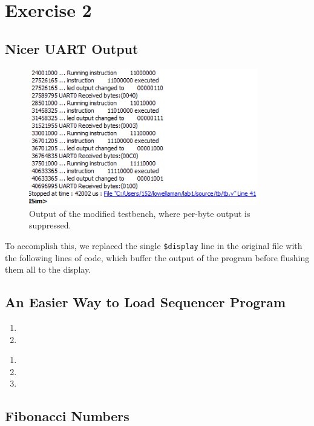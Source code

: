 \documentclass[]{article}
\begin{document}
\section{Exercise 2}


\subsection{Nicer UART Output}
\begin{figure}[H]
\centering
\includegraphics[width=10cm]{nicerUART.PNG}
\caption{Output of the modified testbench, where per-byte output is suppressed.}
\end{figure}

To accomplish this, we replaced the single \texttt{\$display} line in the original file with the following lines of code, which buffer the output of the program before flushing them all to the display.



\subsection{An Easier Way to Load Sequencer Program}

\begin{enumerate}
\item 
\item
\end{enumerate}

\begin{enumerate}
\item 
\item
\item
\end{enumerate}

\subsection{Fibonacci Numbers}
\end{document}
